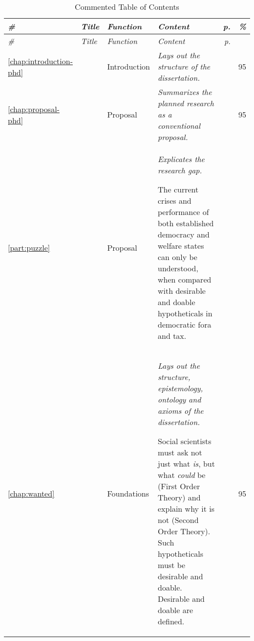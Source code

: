 
\begin{longtabu}
	{lp{3cm}
	p{2cm}
	p{5cm}
	r
	r} 

\caption{Commented Table of Contents\label{tab:commented-toc-phd}}\\

	\toprule 
	
	\emph{\#} 
	&\emph{Title} 
	&\emph{Function} 
	&\emph{Content}	
	&\emph{p.}
	&\emph{\%}
	\\  
	
	\midrule 
	
\endfirsthead 		

	\toprule
	
	\emph{\#} 
	&\emph{Title}
	&\emph{Function}
	&\emph{Content}
	&\emph{p.} 
	&
	\\ 

	\midrule 

\endhead

\small

\ref{chap:introduction-phd}
&	
&	Introduction
&	\emph{Lays out the structure of the dissertation.}

&	\pageref{chap:introduction-phd}
& 95
\\

\ref{chap:proposal-phd}
&	
&	Proposal
&	\emph{Summarizes the planned research as a conventional proposal.}

&	\pageref{chap:introduction-phd}
& 95
\\


\ref{part:puzzle}	
&	
&	Proposal	
&	\emph{Explicates the research gap.} 

	The current crises and performance of both established democracy and welfare states can only be understood, when compared with desirable and doable hypotheticals in democratic fora and tax. 
&	\pageref{part:puzzle}
\\

\ref{chap:wanted}
&	
&	Foundations
&	\emph{Lays out the structure, epistemology, ontology and axioms of the dissertation.}
 
	Social scientists must ask not just what \emph{is}, but what \emph{could} be (First Order Theory) and explain why it is not (Second Order Theory). 
	Such hypotheticals must be desirable and doable. Desirable and doable are defined. 
&	\pageref{chap:wanted}
& 95
\\



\end{longtabu}
